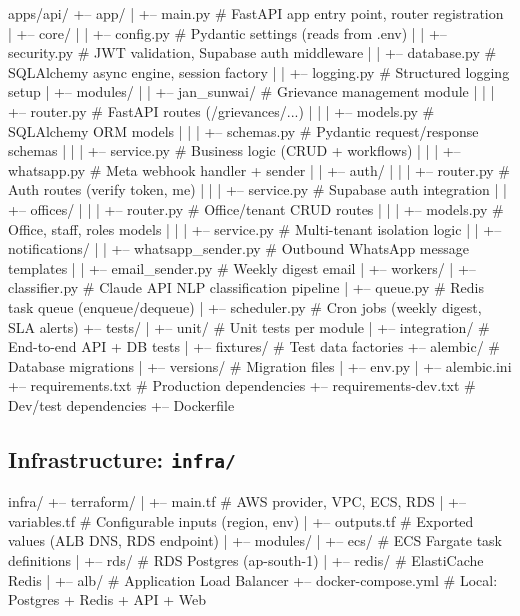 \documentclass[12pt, a4paper]{article}
\begin{document}
\begin{treebox}
apps/api/
+-- app/
|   +-- main.py                      # FastAPI app entry point, router registration
|   +-- core/
|   |   +-- config.py                # Pydantic settings (reads from .env)
|   |   +-- security.py             # JWT validation, Supabase auth middleware
|   |   +-- database.py             # SQLAlchemy async engine, session factory
|   |   +-- logging.py              # Structured logging setup
|   +-- modules/
|   |   +-- jan_sunwai/             # Grievance management module
|   |   |   +-- router.py           # FastAPI routes (/grievances/...)
|   |   |   +-- models.py           # SQLAlchemy ORM models
|   |   |   +-- schemas.py          # Pydantic request/response schemas
|   |   |   +-- service.py          # Business logic (CRUD + workflows)
|   |   |   +-- whatsapp.py         # Meta webhook handler + sender
|   |   +-- auth/
|   |   |   +-- router.py           # Auth routes (verify token, me)
|   |   |   +-- service.py          # Supabase auth integration
|   |   +-- offices/
|   |   |   +-- router.py           # Office/tenant CRUD routes
|   |   |   +-- models.py           # Office, staff, roles models
|   |   |   +-- service.py          # Multi-tenant isolation logic
|   |   +-- notifications/
|   |       +-- whatsapp_sender.py  # Outbound WhatsApp message templates
|   |       +-- email_sender.py     # Weekly digest email
|   +-- workers/
|       +-- classifier.py           # Claude API NLP classification pipeline
|       +-- queue.py                # Redis task queue (enqueue/dequeue)
|       +-- scheduler.py            # Cron jobs (weekly digest, SLA alerts)
+-- tests/
|   +-- unit/                       # Unit tests per module
|   +-- integration/                # End-to-end API + DB tests
|   +-- fixtures/                   # Test data factories
+-- alembic/                        # Database migrations
|   +-- versions/                   # Migration files
|   +-- env.py
|   +-- alembic.ini
+-- requirements.txt                # Production dependencies
+-- requirements-dev.txt            # Dev/test dependencies
+-- Dockerfile
\end{treebox}

\subsection{Infrastructure: \texttt{infra/}}

\begin{treebox}
infra/
+-- terraform/
|   +-- main.tf                     # AWS provider, VPC, ECS, RDS
|   +-- variables.tf                # Configurable inputs (region, env)
|   +-- outputs.tf                  # Exported values (ALB DNS, RDS endpoint)
|   +-- modules/
|       +-- ecs/                    # ECS Fargate task definitions
|       +-- rds/                    # RDS Postgres (ap-south-1)
|       +-- redis/                  # ElastiCache Redis
|       +-- alb/                    # Application Load Balancer
+-- docker-compose.yml              # Local: Postgres + Redis + API + Web
\end{treebox}
\end{document}
